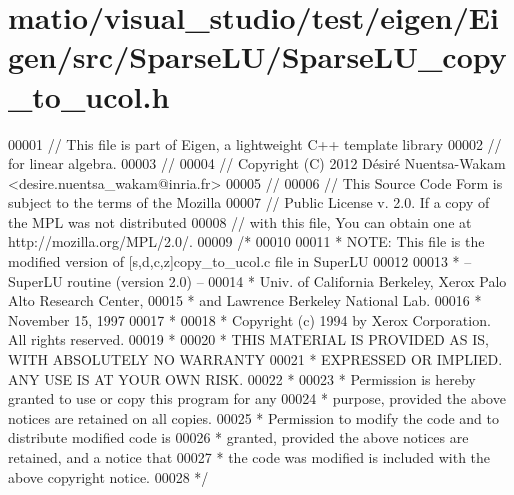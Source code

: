 \hypertarget{matio_2visual__studio_2test_2eigen_2_eigen_2src_2_sparse_l_u_2_sparse_l_u__copy__to__ucol_8h_source}{}\section{matio/visual\+\_\+studio/test/eigen/\+Eigen/src/\+Sparse\+L\+U/\+Sparse\+L\+U\+\_\+copy\+\_\+to\+\_\+ucol.h}
\label{matio_2visual__studio_2test_2eigen_2_eigen_2src_2_sparse_l_u_2_sparse_l_u__copy__to__ucol_8h_source}

\begin{DoxyCode}
00001 \textcolor{comment}{// This file is part of Eigen, a lightweight C++ template library}
00002 \textcolor{comment}{// for linear algebra.}
00003 \textcolor{comment}{//}
00004 \textcolor{comment}{// Copyright (C) 2012 Désiré Nuentsa-Wakam <desire.nuentsa\_wakam@inria.fr>}
00005 \textcolor{comment}{//}
00006 \textcolor{comment}{// This Source Code Form is subject to the terms of the Mozilla}
00007 \textcolor{comment}{// Public License v. 2.0. If a copy of the MPL was not distributed}
00008 \textcolor{comment}{// with this file, You can obtain one at http://mozilla.org/MPL/2.0/.}
00009 \textcolor{comment}{/* }
00010 \textcolor{comment}{ }
00011 \textcolor{comment}{ * NOTE: This file is the modified version of [s,d,c,z]copy\_to\_ucol.c file in SuperLU }
00012 \textcolor{comment}{ }
00013 \textcolor{comment}{ * -- SuperLU routine (version 2.0) --}
00014 \textcolor{comment}{ * Univ. of California Berkeley, Xerox Palo Alto Research Center,}
00015 \textcolor{comment}{ * and Lawrence Berkeley National Lab.}
00016 \textcolor{comment}{ * November 15, 1997}
00017 \textcolor{comment}{ *}
00018 \textcolor{comment}{ * Copyright (c) 1994 by Xerox Corporation.  All rights reserved.}
00019 \textcolor{comment}{ *}
00020 \textcolor{comment}{ * THIS MATERIAL IS PROVIDED AS IS, WITH ABSOLUTELY NO WARRANTY}
00021 \textcolor{comment}{ * EXPRESSED OR IMPLIED.  ANY USE IS AT YOUR OWN RISK.}
00022 \textcolor{comment}{ *}
00023 \textcolor{comment}{ * Permission is hereby granted to use or copy this program for any}
00024 \textcolor{comment}{ * purpose, provided the above notices are retained on all copies.}
00025 \textcolor{comment}{ * Permission to modify the code and to distribute modified code is}
00026 \textcolor{comment}{ * granted, provided the above notices are retained, and a notice that}
00027 \textcolor{comment}{ * the code was modified is included with the above copyright notice.}
00028 \textcolor{comment}{ */}

\end{DoxyCode}
